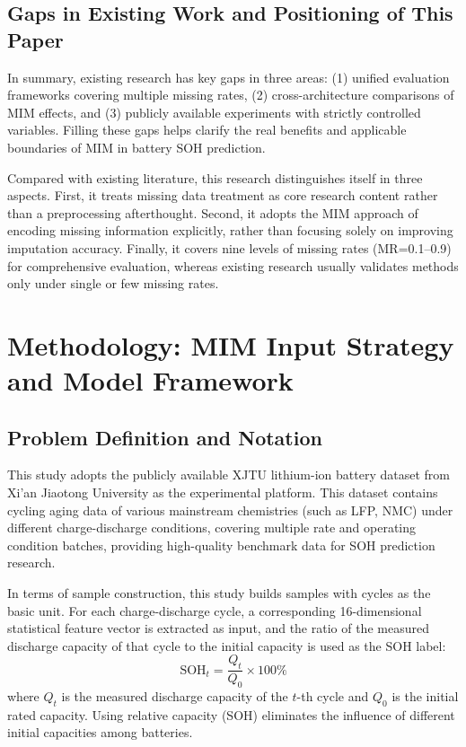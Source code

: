 \documentclass[5p,times]{elsarticle}
\begin{document}
\subsection{Gaps in Existing Work and Positioning of This Paper}

In summary, existing research has key gaps in three areas: (1) unified evaluation frameworks covering multiple missing rates, (2) cross-architecture comparisons of MIM effects, and (3) publicly available experiments with strictly controlled variables. Filling these gaps helps clarify the real benefits and applicable boundaries of MIM in battery SOH prediction.

Compared with existing literature, this research distinguishes itself in three aspects. First, it treats missing data treatment as core research content rather than a preprocessing afterthought. Second, it adopts the MIM approach of encoding missing information explicitly, rather than focusing solely on improving imputation accuracy. Finally, it covers nine levels of missing rates (MR=0.1--0.9) for comprehensive evaluation, whereas existing research usually validates methods only under single or few missing rates.

\section{Methodology: MIM Input Strategy and Model Framework}\label{sec:method}

\subsection{Problem Definition and Notation}

This study adopts the publicly available XJTU lithium-ion battery dataset from Xi'an Jiaotong University as the experimental platform\cite{wang2024open,duan2025lithium}. This dataset contains cycling aging data of various mainstream chemistries (such as LFP, NMC) under different charge-discharge conditions, covering multiple rate and operating condition batches, providing high-quality benchmark data for SOH prediction research\cite{wang2024open,wang2024pinn}.

In terms of sample construction, this study builds samples with cycles as the basic unit. For each charge-discharge cycle, a corresponding 16-dimensional statistical feature vector is extracted as input, and the ratio of the measured discharge capacity of that cycle to the initial capacity is used as the SOH label:
\begin{equation}
    \text{SOH}_t = \frac{Q_t}{Q_0} \times 100\%
    \label{eq:soh}
\end{equation}
where $Q_t$ is the measured discharge capacity of the $t$-th cycle and $Q_0$ is the initial rated capacity. Using relative capacity (SOH) eliminates the influence of different initial capacities among batteries.
\end{document}
